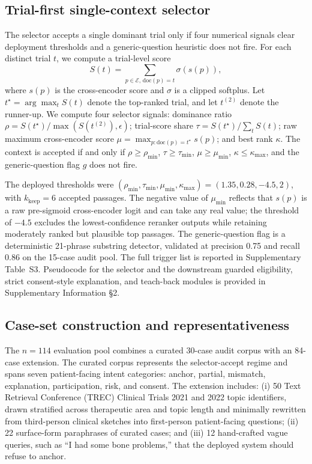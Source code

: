 \documentclass[pdflatex,Numbered]{sn-jnl}
\theoremstyle{plain}
\begin{document}
\subsection{Trial-first single-context selector}
\label{sec:methods_selector}

The selector accepts a single dominant trial only if four numerical signals clear deployment thresholds and a generic-question heuristic does not fire. For each distinct trial $t$, we compute a trial-level score
\[
S(t) = \sum_{p \in \mathcal{E},\, \mathrm{doc}(p)=t} \sigma(s(p)),
\]
where $s(p)$ is the cross-encoder score and $\sigma$ is a clipped softplus. Let $t^\star = \arg\max_t S(t)$ denote the top-ranked trial, and let $t^{(2)}$ denote the runner-up. We compute four selector signals: dominance ratio $\rho = S(t^\star)/\max(S(t^{(2)}), \epsilon)$; trial-score share $\tau = S(t^\star)/\sum_t S(t)$; raw maximum cross-encoder score $\mu = \max_{p:\mathrm{doc}(p)=t^\star} s(p)$; and best rank $\kappa$. The context is accepted if and only if $\rho \ge \rho_{\min}$, $\tau \ge \tau_{\min}$, $\mu \ge \mu_{\min}$, $\kappa \le \kappa_{\max}$, and the generic-question flag $g$ does not fire.

The deployed thresholds were $(\rho_{\min}, \tau_{\min}, \mu_{\min}, \kappa_{\max}) = (1.35, 0.28, -4.5, 2)$, with $k_{\text{keep}}=6$ accepted passages. The negative value of $\mu_{\min}$ reflects that $s(p)$ is a raw pre-sigmoid cross-encoder logit and can take any real value; the threshold of $-4.5$ excludes the lowest-confidence reranker outputs while retaining moderately ranked but plausible top passages. The generic-question flag is a deterministic 21-phrase substring detector, validated at precision 0.75 and recall 0.86 on the 15-case audit pool. The full trigger list is reported in Supplementary Table~S3. Pseudocode for the selector and the downstream guarded eligibility, strict consent-style explanation, and teach-back modules is provided in Supplementary Information \S2.

\subsection{Case-set construction and representativeness}
\label{sec:methods_cases}

The $n=114$ evaluation pool combines a curated 30-case audit corpus with an 84-case extension. The curated corpus represents the selector-accept regime and spans seven patient-facing intent categories: anchor, partial, mismatch, explanation, participation, risk, and consent. The extension includes: (i) 50 Text Retrieval Conference (TREC) Clinical Trials 2021 and 2022 topic identifiers, drawn stratified across therapeutic area and topic length and minimally rewritten from third-person clinical sketches into first-person patient-facing questions; (ii) 22 surface-form paraphrases of curated cases; and (iii) 12 hand-crafted vague queries, such as ``I had some bone problems,'' that the deployed system should refuse to anchor.
\end{document}
